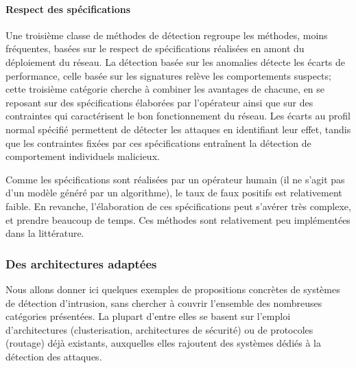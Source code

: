         \paragraph{Respect des spécifications}
Une troisième classe de méthodes de détection regroupe les méthodes, moins fréquentes, basées sur le respect de spécifications réalisées en amont du déploiement du réseau.
La détection basée sur les anomalies détecte les écarts de performance, celle basée sur les signatures relève les comportements suspects; cette troisième catégorie cherche à combiner les avantages de chacune, en se reposant sur des spécifications élaborées par l'opérateur ainsi que sur des contraintes qui caractérisent le bon fonctionnement du réseau.
Les écarts au profil normal spécifié permettent de détecter les attaques en identifiant leur effet, tandis que les contraintes fixées par ces spécifications entraînent la détection de comportement individuels malicieux.

Comme les spécifications sont réalisées par un opérateur humain (il ne s'agit pas d'un modèle généré par un algorithme), le taux de faux positifs est relativement faible.
En revanche, l'élaboration de ces spécifications peut s'avérer très complexe, et prendre beaucoup de temps.
Ces méthodes sont relativement peu implémentées dans la littérature.

    \subsubsection{Des architectures adaptées}
Nous allons donner ici quelques exemples de propositions concrètes de systèmes de détection d'intrusion, sans chercher à couvrir l'ensemble des nombreuses catégories présentées.
La plupart d'entre elles se basent sur l'emploi d'architectures (clusterisation, architectures de sécurité) ou de protocoles (routage) déjà existants, auxquelles elles rajoutent des systèmes dédiés à la détection des attaques.

